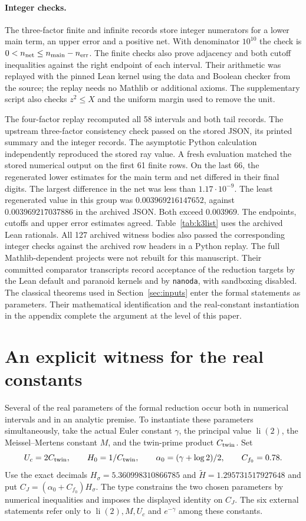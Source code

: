 \documentclass[11pt]{article}
\theoremstyle{remark}\newtheorem{remark}[theorem]{Remark}
\begin{document}
\paragraph{Integer checks.}
The three-factor finite and infinite records store integer numerators for a lower main term, an upper error and a positive net. With denominator $10^{10}$ the check is
$0<n_{\rm net}\le n_{\rm main}-n_{\rm err}$. The finite checks also prove adjacency and both cutoff inequalities against the right endpoint of each interval. Their arithmetic was replayed with the pinned Lean kernel using the data and Boolean checker from the source; the replay needs no Mathlib or additional axioms. The supplementary script also checks $z^2\le X$ and the uniform margin used to remove the unit.


The four-factor replay recomputed all 58 intervals and both tail records. The upstream three-factor consistency check passed on the stored JSON, its printed summary and the integer records. The asymptotic Python calculation independently reproduced the stored ray value. A fresh evaluation matched the stored numerical output on the first 61 finite rows. On the last 66, the regenerated lower estimates for the main term and net differed in their final digits. The largest difference in the net was less than $1.17\cdot10^{-9}$. The least regenerated value in this group was $0.003969216147652$, against $0.003969217037886$ in the archived JSON. Both exceed $0.003969$. The endpoints, cutoffs and upper error estimates agreed. Table~\ref{tab:k3list} uses the archived Lean rationals. All 127 archived witness bodies also passed the corresponding integer checks against the archived row headers in a Python replay. The full Mathlib-dependent projects were not rebuilt for this manuscript. Their committed comparator transcripts record acceptance of the reduction targets by the Lean default and paranoid kernels and by \texttt{nanoda}, with sandboxing disabled. The classical theorems used in Section~\ref{sec:inputs} enter the formal statements as parameters. Their mathematical identification and the real-constant instantiation in the appendix complete the argument at the level of this paper.

\appendix
\section{An explicit witness for the real constants}\label{app:constants}
Several of the real parameters of the formal reduction occur both in numerical intervals and in an analytic premise. To instantiate these parameters simultaneously, take the actual Euler constant $\gamma$, the principal value $\operatorname{li}(2)$, the Meissel--Mertens constant $M$, and the twin-prime product $C_{\rm twin}$. Set
\[
 U_c=2C_{\rm twin},\qquad H_0=1/C_{\rm twin},\qquad
 \alpha_0=(\gamma+\log 2)/2,\qquad C_{f_0}=0.78.
\]
Use the exact decimals $H_\sigma=5.360998310866785$ and $\widetilde H=1.295731517927648$ and put $C_J=(\alpha_0+C_{f_0})H_\sigma$. The type constrains the two chosen parameters by numerical inequalities and imposes the displayed identity on $C_J$. The six external statements refer only to $\operatorname{li}(2),M,U_c$ and $e^{-\gamma}$ among these constants.
\end{document}
